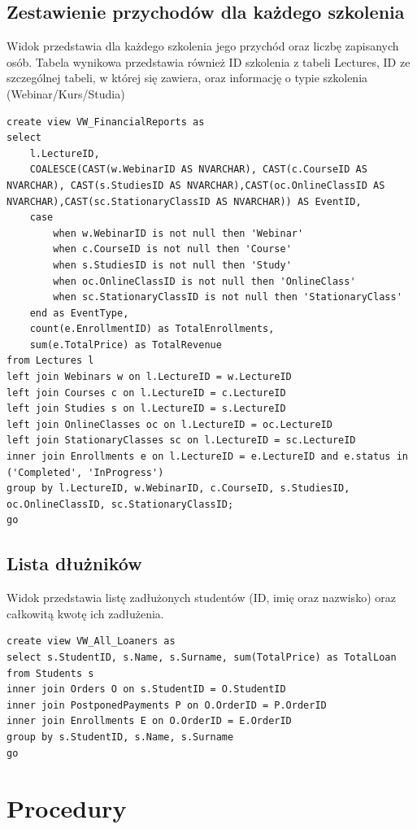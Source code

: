\documentclass[11pt,a4paper]{article}
\begin{document}
\subsection{Zestawienie przychodów dla każdego szkolenia}
Widok przedstawia dla każdego szkolenia jego przychód oraz liczbę zapisanych osób. Tabela wynikowa przedstawia również ID szkolenia z tabeli Lectures, ID ze szczególnej tabeli, w której się zawiera, oraz informację o typie szkolenia (Webinar/Kurs/Studia) 
\begin{Verbatim}[breaklines=true]
create view VW_FinancialReports as
select
    l.LectureID,
    COALESCE(CAST(w.WebinarID AS NVARCHAR), CAST(c.CourseID AS NVARCHAR), CAST(s.StudiesID AS NVARCHAR),CAST(oc.OnlineClassID AS NVARCHAR),CAST(sc.StationaryClassID AS NVARCHAR)) AS EventID,
    case
        when w.WebinarID is not null then 'Webinar'
        when c.CourseID is not null then 'Course'
        when s.StudiesID is not null then 'Study'
        when oc.OnlineClassID is not null then 'OnlineClass'
        when sc.StationaryClassID is not null then 'StationaryClass'
    end as EventType,
    count(e.EnrollmentID) as TotalEnrollments,
    sum(e.TotalPrice) as TotalRevenue
from Lectures l
left join Webinars w on l.LectureID = w.LectureID
left join Courses c on l.LectureID = c.LectureID
left join Studies s on l.LectureID = s.LectureID
left join OnlineClasses oc on l.LectureID = oc.LectureID
left join StationaryClasses sc on l.LectureID = sc.LectureID
inner join Enrollments e on l.LectureID = e.LectureID and e.status in ('Completed', 'InProgress')
group by l.LectureID, w.WebinarID, c.CourseID, s.StudiesID, oc.OnlineClassID, sc.StationaryClassID;
go
\end{Verbatim}

\subsection{Lista dłużników}
Widok przedstawia listę zadłużonych studentów (ID, imię oraz nazwisko) oraz całkowitą kwotę ich zadłużenia. 
\begin{Verbatim}[breaklines=true]
create view VW_All_Loaners as
select s.StudentID, s.Name, s.Surname, sum(TotalPrice) as TotalLoan
from Students s
inner join Orders O on s.StudentID = O.StudentID
inner join PostponedPayments P on O.OrderID = P.OrderID
inner join Enrollments E on O.OrderID = E.OrderID
group by s.StudentID, s.Name, s.Surname
go
\end{Verbatim}

\section{Procedury}
\end{document}
